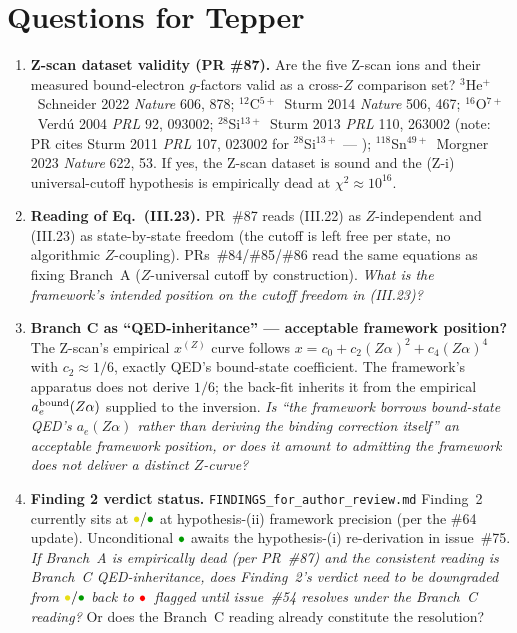 \section{Questions for Tepper}
\label{sec:questions-for-tepper}

\begin{enumerate}[leftmargin=*,label=Q\arabic*.]

\item \textbf{Z-scan dataset validity (PR \#87).}
Are the five Z-scan ions and their measured bound-electron $g$-factors valid
as a cross-$Z$ comparison set?
$^3$He$^+$~Schneider 2022 \emph{Nature} 606, 878;
$^{12}$C$^{5+}$~Sturm 2014 \emph{Nature} 506, 467;
$^{16}$O$^{7+}$~Verd\'u 2004 \emph{PRL} 92, 093002;
$^{28}$Si$^{13+}$~Sturm 2013 \emph{PRL} 110, 263002 (note: PR cites Sturm 2011
\emph{PRL} 107, 023002 for $^{28}$Si$^{13+}$ ---
);
$^{118}$Sn$^{49+}$~Morgner 2023 \emph{Nature} 622, 53.
If yes, the Z-scan dataset is sound and the (Z-i) universal-cutoff
hypothesis is empirically dead at $\chi^2 \approx 10^{16}$.

\item \textbf{Reading of Eq.~(III.23).}
PR~\#87 reads (III.22) as $Z$-independent and (III.23) as state-by-state
freedom (the cutoff is left free per state, no algorithmic $Z$-coupling).
PRs~\#84/\#85/\#86 read the same equations as fixing Branch~A
($Z$-universal cutoff by construction).
\emph{What is the framework's intended position on the cutoff freedom in
(III.23)?}

\item \textbf{Branch C as ``QED-inheritance'' --- acceptable framework position?}
The Z-scan's empirical $x^{(Z)}$ curve follows
$x = c_0 + c_2(Z\alpha)^2 + c_4(Z\alpha)^4$ with $c_2 \approx 1/6$, exactly
QED's bound-state coefficient. The framework's apparatus does not derive
$1/6$; the back-fit inherits it from the empirical
$a_e^{\rm bound}(Z\alpha)$ supplied to the inversion.
\emph{Is ``the framework borrows bound-state QED's $a_e(Z\alpha)$ rather
than deriving the binding correction itself'' an acceptable framework
position, or does it amount to admitting the framework does not deliver a
distinct $Z$-curve?}

\item \textbf{Finding 2 verdict status.}
\texttt{FINDINGS\_for\_author\_review.md} Finding~2 currently sits at
$\mathbin{\hbox{\color{yellow!90!black}\(\bullet\)}}/
\mathbin{\hbox{\color{green!60!black}\(\bullet\)}}$
at hypothesis-(ii) framework precision (per the \#64 update). Unconditional
$\mathbin{\hbox{\color{green!60!black}\(\bullet\)}}$ awaits the hypothesis-(i)
re-derivation in issue~\#75.
\emph{If Branch~A is empirically dead (per PR~\#87) and the consistent
reading is Branch~C QED-inheritance, does Finding~2's verdict need to be
downgraded from
$\mathbin{\hbox{\color{yellow!90!black}\(\bullet\)}}/
\mathbin{\hbox{\color{green!60!black}\(\bullet\)}}$
back to $\mathbin{\hbox{\color{red}\(\bullet\)}}$~flagged
until issue~\#54 resolves under the Branch~C reading?}
Or does the Branch~C reading already constitute the resolution?


\end{enumerate}
